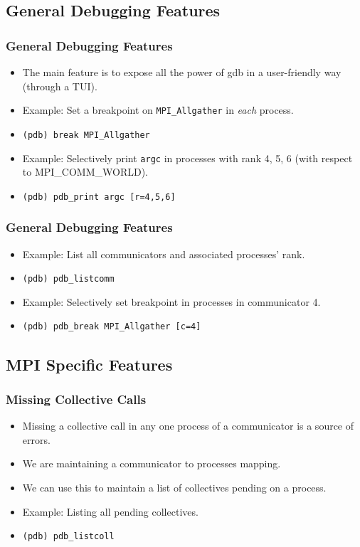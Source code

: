 \documentclass{beamer}
\begin{document}
\subsection{General Debugging Features}

\begin{frame}
  \frametitle{General Debugging Features}
 \begin{itemize}
 \item <1-> The main feature is to expose all the power of gdb in a user-friendly way (through a TUI).
 \item <2-> Example: Set a breakpoint on \texttt{MPI\_Allgather} in \textit{each} process.
 \item <3-> \texttt{(pdb) break MPI\_Allgather}
 \item <4-> Example: Selectively print \texttt{argc} in processes with rank 4, 5, 6 (with respect to MPI\_COMM\_WORLD).
 \item <5-> \texttt{(pdb) pdb\_print argc [r=4,5,6]}
 \end{itemize}
\end{frame}

\begin{frame}
  \frametitle{General Debugging Features}
 \begin{itemize}
 \item <1-> Example: List all communicators and associated processes' rank.
 \item <2-> \texttt{(pdb) pdb\_listcomm}
 \item <3-> Example: Selectively set breakpoint in processes in communicator 4.
 \item <4-> \texttt{(pdb) pdb\_break MPI\_Allgather [c=4]}
 \end{itemize}
\end{frame}


\subsection{MPI Specific Features}
\begin{frame}
  \frametitle{Missing Collective Calls}
 \begin{itemize}
 \item <1-> Missing a collective call in any one process of a communicator is a source of errors.
 \item <2-> We are maintaining a communicator to processes mapping.
 \item <3-> We can use this to maintain a list of collectives pending on a process.
 \item <4-> Example: Listing all pending collectives.
 \item <5-> \texttt{(pdb) pdb\_listcoll}
 \end{itemize}
\end{frame}
\end{document}
